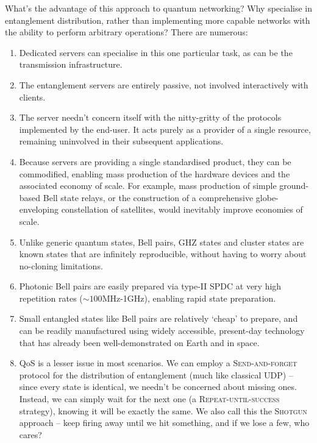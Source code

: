 What's the advantage of this approach to quantum networking? Why specialise in entanglement distribution, rather than implementing more capable networks with the ability to perform arbitrary operations? There are numerous:
\begin{enumerate}
\item Dedicated servers can specialise in this one particular task, as can be the transmission infrastructure.
\item The entanglement servers are entirely passive, not involved interactively with clients.
\item The server needn't concern itself with the nitty-gritty of the protocols implemented by the end-user. It acts purely as a provider of a single resource, remaining uninvolved in their subsequent applications.
\item Because servers are providing a single standardised product, they can be commodified, enabling mass production of the hardware devices and the associated economy of scale. For example, mass production of simple ground-based Bell state relays, or the construction of a comprehensive globe-enveloping constellation of satellites, would inevitably improve economies of scale.
\item Unlike generic quantum states, Bell pairs, GHZ states and cluster states are known states that are infinitely reproducible, without having to worry about no-cloning limitations.
\item Photonic Bell pairs are easily prepared via type-II SPDC at very high repetition rates (\mbox{$\sim 100$MHz-1GHz}), enabling rapid state preparation.
\item Small entangled states like Bell pairs are relatively `cheap' to prepare, and can be readily manufactured using widely accessible, present-day technology that has already been well-demonstrated on Earth and in space.
\item QoS is a lesser issue in most scenarios. We can employ a \textsc{Send-and-forget} protocol for the distribution of entanglement (much like classical UDP) -- since every state is identical, we needn't be concerned about missing ones. Instead, we can simply wait for the next one (a \textsc{Repeat-until-success} strategy), knowing it will be exactly the same. We also call this the \textsc{Shotgun} approach -- keep firing away until we hit something, and if we lose a few, who cares?

\end{enumerate}
